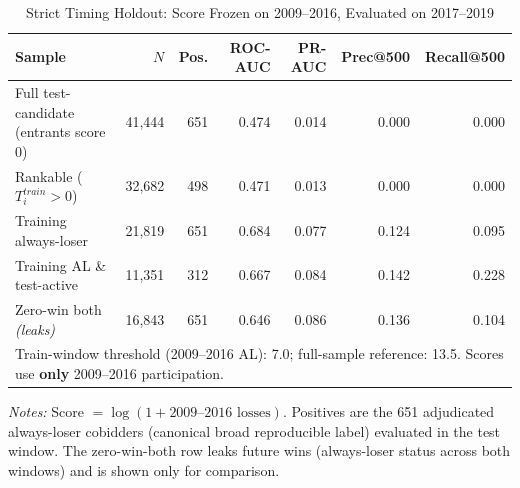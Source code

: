 \begin{table}[htbp]\centering
\caption{Strict Timing Holdout: Score Frozen on 2009--2016, Evaluated on 2017--2019}
\label{tab:strict_timing_holdout}
\footnotesize
\begin{tabular}{lrrrrrr}
\toprule
Sample & $N$ & Pos. & ROC-AUC & PR-AUC & Prec@500 & Recall@500 \\
\midrule
Full test-candidate (entrants score 0) & 41,444 & 651 & 0.474 & 0.014 & 0.000 & 0.000 \\
Rankable ($T_{i}^{train}>0$) & 32,682 & 498 & 0.471 & 0.013 & 0.000 & 0.000 \\
Training always-loser & 21,819 & 651 & 0.684 & 0.077 & 0.124 & 0.095 \\
Training AL \& test-active & 11,351 & 312 & 0.667 & 0.084 & 0.142 & 0.228 \\
Zero-win both \textit{(leaks)} & 16,843 & 651 & 0.646 & 0.086 & 0.136 & 0.104 \\
\midrule
\multicolumn{7}{l}{\footnotesize Train-window threshold (2009--2016 AL): 7.0; full-sample reference: 13.5. Scores use \textbf{only} 2009--2016 participation.} \\
\bottomrule
\end{tabular}
\begin{minipage}{\linewidth}\vspace{2pt}\footnotesize
\textit{Notes:} Score $=\log(1+\text{2009--2016 losses})$. Positives are the 651 adjudicated always-loser cobidders (canonical broad reproducible label) evaluated in the test window. The zero-win-both row leaks future wins (always-loser status across both windows) and is shown only for comparison.
\end{minipage}
\end{table}
